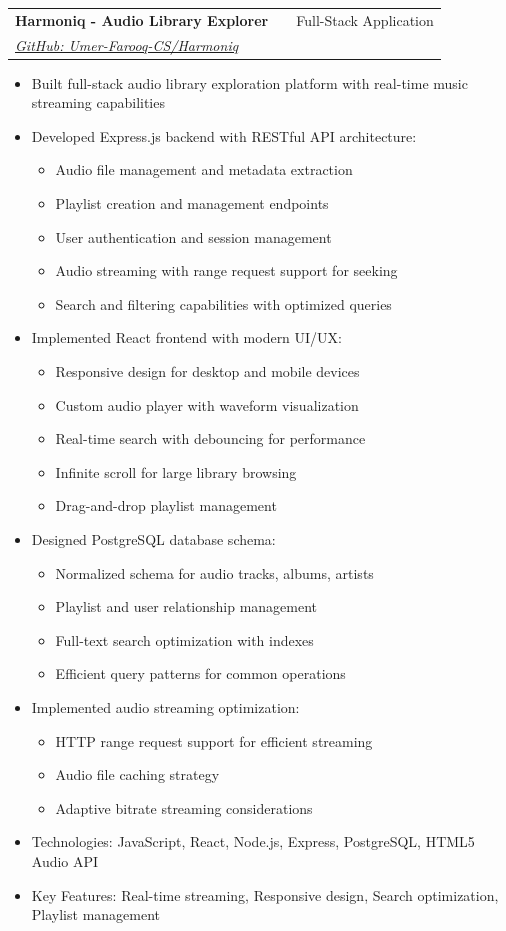 \documentclass[a4paper,12pt]{article}
\makeatletter
\newenvironment{projectdetailed}[3]
    {
    \begin{tabularx}{\linewidth}{@{}l X r@{}}
    \textbf{#1} & \hfill & #2 \\
    \textit{#3} & & \\[3.75pt]
    \end{tabularx}
    \begin{minipage}[t]{\linewidth}
    \begin{itemize}[nosep,after=\strut, leftmargin=1em, itemsep=2pt,label=--]
    }
    {
    \end{itemize}
    \end{minipage}
    \vspace{6pt}
    }
\makeatother
\begin{document}
\begin{projectdetailed}{Harmoniq - Audio Library Explorer}{Full-Stack Application}{\href{https://github.com/Umer-Farooq-CS/Harmoniq}{GitHub: Umer-Farooq-CS/Harmoniq}}
\item Built full-stack audio library exploration platform with real-time music streaming capabilities
\item Developed Express.js backend with RESTful API architecture:
\begin{itemize}[nosep, leftmargin=2em]
    \item Audio file management and metadata extraction
    \item Playlist creation and management endpoints
    \item User authentication and session management
    \item Audio streaming with range request support for seeking
    \item Search and filtering capabilities with optimized queries
\end{itemize}
\item Implemented React frontend with modern UI/UX:
\begin{itemize}[nosep, leftmargin=2em]
    \item Responsive design for desktop and mobile devices
    \item Custom audio player with waveform visualization
    \item Real-time search with debouncing for performance
    \item Infinite scroll for large library browsing
    \item Drag-and-drop playlist management
\end{itemize}
\item Designed PostgreSQL database schema:
\begin{itemize}[nosep, leftmargin=2em]
    \item Normalized schema for audio tracks, albums, artists
    \item Playlist and user relationship management
    \item Full-text search optimization with indexes
    \item Efficient query patterns for common operations
\end{itemize}
\item Implemented audio streaming optimization:
\begin{itemize}[nosep, leftmargin=2em]
    \item HTTP range request support for efficient streaming
    \item Audio file caching strategy
    \item Adaptive bitrate streaming considerations
\end{itemize}
\item Technologies: JavaScript, React, Node.js, Express, PostgreSQL, HTML5 Audio API
\item Key Features: Real-time streaming, Responsive design, Search optimization, Playlist management
\end{projectdetailed}
\end{document}
